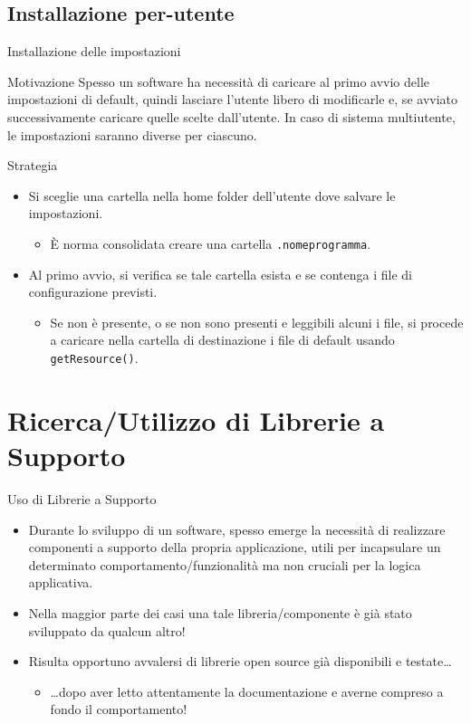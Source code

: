 \documentclass[presentation]{beamer}
\begin{document}
\subsection{Installazione per-utente}

\begin{frame}{Installazione delle impostazioni}
\begin{block}{Motivazione}
Spesso un software ha necessità di caricare al primo avvio delle impostazioni di default, quindi lasciare l'utente libero di modificarle e, se avviato successivamente caricare quelle scelte dall'utente. In caso di sistema multiutente, le impostazioni saranno diverse per ciascuno.
\end{block}

\begin{block}{Strategia}
\begin{itemize}
\item Si sceglie una cartella nella home folder dell'utente dove salvare le impostazioni. 
\begin{itemize}
\item È norma consolidata creare una cartella \texttt{.nomeprogramma}.
\end{itemize}

\item Al primo avvio, si verifica se tale cartella esista e se contenga i file di configurazione previsti.
\begin{itemize}
\item Se non è presente, o se non sono presenti e leggibili alcuni i file, si procede a caricare nella cartella di destinazione i file di default usando \texttt{getResource()}.
\end{itemize}
\end{itemize}
\end{block}
\end{frame}

\section{Ricerca/Utilizzo di Librerie a Supporto}
\begin{frame}{Uso di Librerie a Supporto}
\begin{itemize}\itemsep15pt
\item Durante lo sviluppo di un software, spesso emerge la necessità di realizzare componenti a supporto della propria applicazione, utili per incapsulare un determinato comportamento/funzionalità ma non cruciali per la logica applicativa.

\item Nella maggior parte dei casi una tale libreria/componente è già stato sviluppato da qualcun altro!

\item Risulta opportuno avvalersi di librerie open source già disponibili e testate\dots
\begin{itemize}
\item \dots dopo aver letto attentamente la documentazione e averne compreso a fondo il comportamento!
\end{itemize}
\end{itemize}
\end{frame}
\end{document}
